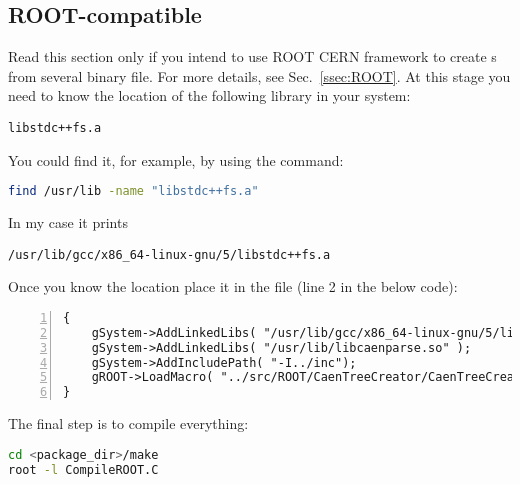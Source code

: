 \subsection{ROOT-compatible}\label{ssec:install:ROOT}
Read this section only if you intend to use ROOT CERN framework to create s
from several binary file. For more details, see Sec.~\ref{ssec:ROOT}.
At this stage you need to know the location of the following library in your system:
\begin{lstlisting}
libstdc++fs.a
\end{lstlisting}
You could find it, for example, by using the  command:
\begin{lstlisting}[language=bash]
find /usr/lib -name "libstdc++fs.a"
\end{lstlisting}
In my case it prints 
\begin{lstlisting}
/usr/lib/gcc/x86_64-linux-gnu/5/libstdc++fs.a
\end{lstlisting}
Once you know the location place it in the  file
(line 2 in the below code):
\begin{lstlisting}[numbers=left]
{
    gSystem->AddLinkedLibs( "/usr/lib/gcc/x86_64-linux-gnu/5/libstdc++fs.a" );//place the correct path to the libstdc++fs.a
    gSystem->AddLinkedLibs( "/usr/lib/libcaenparse.so" );
    gSystem->AddIncludePath( "-I../inc");
    gROOT->LoadMacro( "../src/ROOT/CaenTreeCreator/CaenTreeCreator.cpp+" );
}
\end{lstlisting}

The final step is to compile everything: 
\begin{lstlisting}[language=bash]
cd <package_dir>/make
root -l CompileROOT.C
\end{lstlisting}
